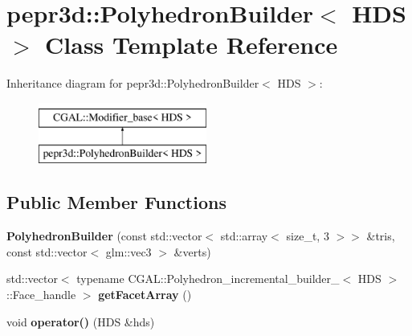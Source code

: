 \hypertarget{classpepr3d_1_1_polyhedron_builder}{}\section{pepr3d\+::Polyhedron\+Builder$<$ H\+DS $>$ Class Template Reference}
\label{classpepr3d_1_1_polyhedron_builder}
Inheritance diagram for pepr3d\+::Polyhedron\+Builder$<$ H\+DS $>$\+:\begin{figure}[H]
\begin{center}
\leavevmode
\includegraphics[height=2.000000cm]{classpepr3d_1_1_polyhedron_builder}
\end{center}
\end{figure}
\subsection*{Public Member Functions}
\begin{DoxyCompactItemize}
\item 
\mbox{\label{classpepr3d_1_1_polyhedron_builder_ade2aac3429d816f8f33b42f82c090227}} 
{\bfseries Polyhedron\+Builder} (const std\+::vector$<$ std\+::array$<$ size\+\_\+t, 3 $>$$>$ \&tris, const std\+::vector$<$ glm\+::vec3 $>$ \&verts)
\item 
\mbox{\label{classpepr3d_1_1_polyhedron_builder_a5c36edf689effc6e9fb14ff9bcfd3171}} 
std\+::vector$<$ typename C\+G\+A\+L\+::\+Polyhedron\+\_\+incremental\+\_\+builder\+\_$<$ H\+DS $>$\+::Face\+\_\+handle $>$ {\bfseries get\+Facet\+Array} ()
\item 
\mbox{\label{classpepr3d_1_1_polyhedron_builder_aa0b87009527c00ab2bcf50fbfdad888f}} 
void {\bfseries operator()} (H\+DS \&hds)
\end{DoxyCompactItemize}
